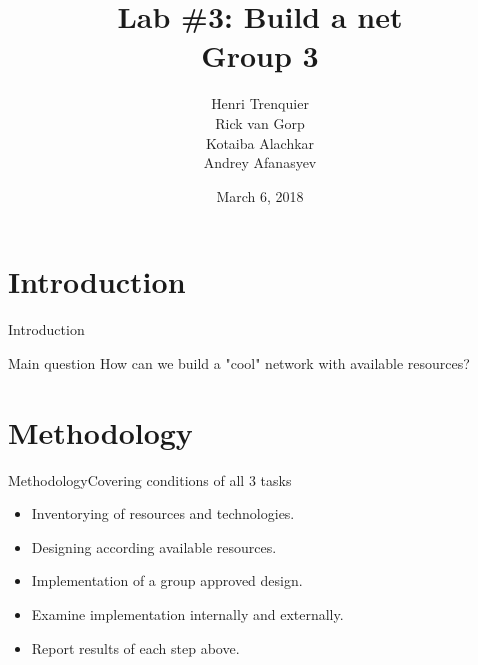 \documentclass{beamer}
\title[]{Lab \#3: Build a net \\ Group 3} %
\author{Henri Trenquier \\ Rick van Gorp \\ Kotaiba Alachkar \\ Andrey Afanasyev} %
\institute[University of Amsterdam] %
{
University of Amsterdam \\ %
\medskip
}
\date{March 6, 2018} %
\begin{document}
\begin{frame}
\titlepage %
\end{frame}

\section{Introduction}
\begin{frame}{Introduction}
\begin{block}{Main question}
 How can we build a "cool" network with available resources?
\end{block}
\end{frame}

\section{Methodology}
\begin{frame}{Methodology}{Covering conditions of all 3 tasks}
\begin{itemize}
    \item Inventorying of resources and technologies.
    \item Designing according available resources.
    \item Implementation of a group approved design.
    \item Examine implementation internally and externally.
    \item Report results of each step above.
\end{itemize}
\end{frame}
\end{document}
